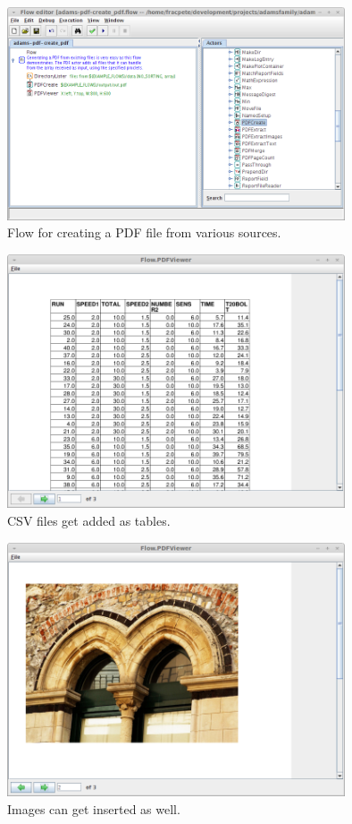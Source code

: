 \documentclass[a4paper]{book}
\begin{document}
\begin{figure}[htb]
  \centering
  \includegraphics[width=10.0cm]{images/pdf-create-flow.png}
  \caption{Flow for creating a PDF file from various sources.}
  \label{pdf-create-flow}
\end{figure}

\begin{figure}[htb]
  \centering
  \includegraphics[width=10.0cm]{images/pdf-create-output1.png}
  \caption{CSV files get added as tables.}
  \label{pdf-create-output1}
\end{figure}

\begin{figure}[htb]
  \centering
  \includegraphics[width=10.0cm]{images/pdf-create-output2.png}
  \caption{Images can get inserted as well.}
  \label{pdf-create-output2}
\end{figure}
\end{document}
